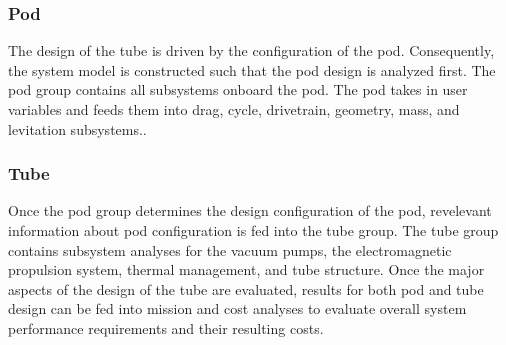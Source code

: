 \subsubsection{Pod}
	 The design of the tube is driven by the configuration of the pod. Consequently, the system model is constructed such that the pod design is analyzed first. The pod group contains all subsystems onboard the pod. The pod takes in user variables and feeds them into drag, cycle, drivetrain, geometry, mass, and levitation subsystems..
\subsubsection{Tube}
	Once the pod group determines the design configuration of the pod, revelevant information about pod configuration is fed into the tube group. The tube group contains subsystem analyses for the vacuum pumps, the electromagnetic propulsion system, thermal management, and tube structure. Once the major aspects of the design of the tube are evaluated, results for both pod and tube design can be fed into mission and cost analyses to evaluate overall system performance requirements and their resulting costs.

